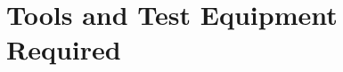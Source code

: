 \documentclass[../../testPlan.tex]{subfiles}
\begin{document}
	\chapter{Tools and Test Equipment Required}
\end{document}
